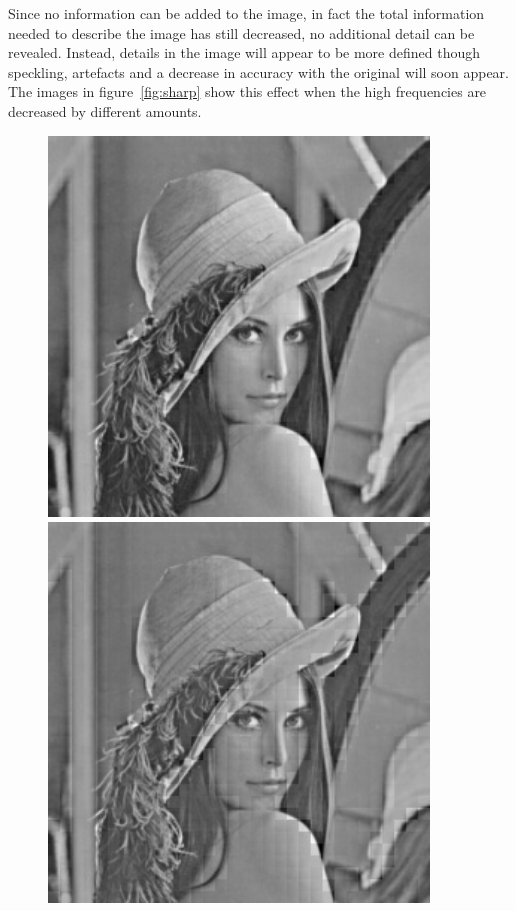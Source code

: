 		Since no information can be added to the image, in fact the total information needed to describe the image has still decreased, no additional detail can be revealed. Instead, details in the image will appear to be more defined though speckling, artefacts and a decrease in accuracy with the original will soon appear. The images in figure~\ref{fig:sharp} show this effect when the high frequencies are decreased by different amounts.
		\begin{figure}[ht]
			\centering
			\begin{minipage}[c]{0.3\linewidth}
				\centering
			 	\includegraphics[width=0.9\textwidth]{lena_sharp1.jpg}
			\end{minipage}
			\begin{minipage}[c]{0.3\linewidth}
				\centering
			 	\includegraphics[width=0.9\textwidth]{lena_sharp2.jpg}

\end{minipage}
\end{figure}
